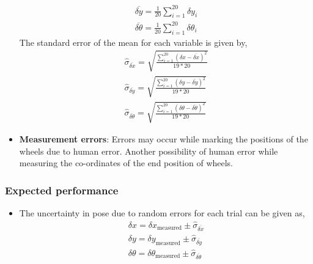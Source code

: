 \documentclass[11pt,a4paper,openright,twoside]{extreport}
\begin{document}
\begin{itemize}
\begin{align*}
\overline{\delta y} = \frac{1}{20} \sum_{i=1}^{20} \delta y_i \\
\overline{\delta \theta} = \frac{1}{20} \sum_{i=1}^{20} \delta \theta_i
\end{align*}
The standard error of the mean for each variable is given by,
\begin{align*}
\hat{\sigma}_{\overline{\delta x}} = \sqrt{\frac{\sum_{i=1}^{20} (\delta x - \overline{\delta x})^2}{19 * 20}} \\
\hat{\sigma}_{\overline{\delta y}} = \sqrt{\frac{\sum_{i=1}^{20} (\delta y - \overline{\delta y})^2}{19 * 20}} \\
\hat{\sigma}_{\overline{\delta \theta}} = \sqrt{\frac{\sum_{i=1}^{20} (\delta \theta - \overline{\delta \theta})^2}{19 * 20}}
\end{align*}

\item \textbf{Measurement errors}: Errors may occur while marking the positions of the wheels due to human error. Another possibility of human error while measuring the co-ordinates of the end position of wheels.   

\end{itemize}


\subsubsection*{Expected performance}
\begin{itemize} 
\item The uncertainty in pose due to random errors for each trial can be given as,
\begin{align*}
\delta x = \delta x_{\text{measured}} \pm \hat{\sigma}_{\overline{\delta x}} \\
\delta y = \delta y_{\text{measured}} \pm \hat{\sigma}_{\overline{\delta y}} \\
\delta \theta = \delta \theta_{\text{measured}} \pm \hat{\sigma}_{\overline{\delta \theta}}
\end{align*}
\end{itemize}
\end{document}
